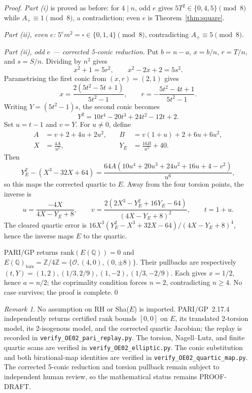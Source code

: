 \documentclass[12pt]{amsart}
\theoremstyle{plain}
\theoremstyle{definition}
\theoremstyle{remark}
\newtheorem{remark}[theorem]{Remark}
\newcommand{\Aplus}{A_{+}}
\begin{document}
\begin{proof}
\emph{Part (i)} is proved as before: for $4\mid n$, odd $e$ gives $5T^2\in\{0,4,5\}
\pmod{8}$ while $\Aplus\equiv1\pmod{8}$, a contradiction; even $e$ is
Theorem~\ref{thm:square}.

\emph{Part (ii), even $e$:} $5^e m^2=\square\in\{0,1,4\}\pmod{8}$, contradicting
$\Aplus\equiv5\pmod{8}$.

\emph{Part (ii), odd $e$ — corrected 5-conic reduction.}
Put $b=n-a$, $x=b/n$, $r=T/n$, and $s=S/n$.  Dividing by $n^2$ gives
$$x^2+1=5r^2,\qquad x^2-2x+2=5s^2.$$
Parametrising the first conic from $(x,r)=(2,1)$ gives
$$x=\frac{2(5t^2-5t+1)}{5t^2-1},\qquad
  r=-\frac{5t^2-4t+1}{5t^2-1}.$$
Writing $Y=(5t^2-1)s$, the second conic becomes
$$Y^2=10t^4-20t^3+24t^2-12t+2.$$
Set $u=t-1$ and $v=Y$.  For $u\ne0$, define
\[
  \begin{aligned}
    A&=v+2+4u+2u^2,\quad &B&=v(1+u)+2+6u+6u^2,\\
    X&=\frac{4A}{u^2},\quad &Y_E&=\frac{16B}{u^3}+40.
  \end{aligned}
\]
Then
\[
  Y_E^2-(X^3-32X+64)=
  \frac{64A(10u^4+20u^3+24u^2+16u+4-v^2)}{u^6},
\]
so this maps the corrected quartic to $E$.  Away from the four torsion points,
the inverse is
\[
  u=\frac{-4X}{4X-Y_E+8},\qquad
  v=\frac{2(2X^3-Y_E^2+16Y_E-64)}{(4X-Y_E+8)^2},\qquad t=1+u.
\]
The cleared quartic error is
$16X^3(Y_E^2-X^3+32X-64)/(4X-Y_E+8)^4$, hence the inverse maps $E$ to the
quartic.

PARI/GP returns $\mathrm{rank}(E(\mathbb{Q}))=0$ and
$E(\mathbb{Q})_{\mathrm{tors}}=\mathbb{Z}/4\mathbb{Z}
=\{\mathcal{O},(4,0),(0,\pm8)\}$.  Their pullbacks are respectively
$(t,Y)=(1,2),(1/3,2/9),(1,-2),(1/3,-2/9)$.  Each gives $x=1/2$, hence
$a=n/2$; the coprimality condition forces $n=2$, contradicting $n\ge4$.
No case survives; the proof is complete.\qed
\end{proof}

\begin{remark}
No assumption on RH or Sha($E$) is imported.  PARI/GP~2.17.4 independently
returns certified rank bounds $[0,0]$ on $E$, its translated 2-torsion model,
its 2-isogenous model, and the corrected quartic Jacobian; the replay is recorded in
\texttt{verify\_OE02\_pari\_replay.py}.  The torsion, Nagell--Lutz, and finite
quartic scans are verified in \texttt{verify\_OE02\_elliptic.py}.  The conic
substitution and both birational-map identities are verified in
\texttt{verify\_OE02\_quartic\_map.py}.
The corrected 5-conic reduction and torsion pullback remain subject to independent human
review, so the mathematical status remains PROOF-DRAFT.
\end{remark}
\end{document}
